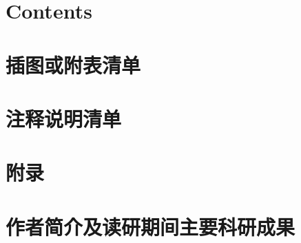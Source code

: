 \documentclass{aust-thesis}
\begin{document}

\austthesiscover
\clearpage

\austthesisdeclaration
\clearpage



\austromanpagenum







\section*{Contents}
\clearpage

\section{插图或附表清单}
\clearpage

\section{注释说明清单}
\clearpage



\austarabicpagenum







\section{附录}
\clearpage



\section{作者简介及读研期间主要科研成果}
\clearpage

\end{document}
